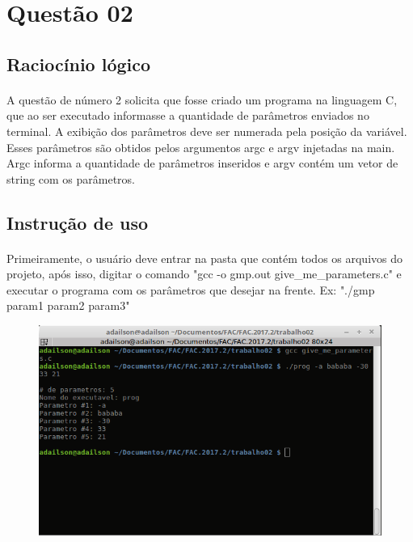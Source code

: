 \documentclass[a4paper, 12pt]{article}
\begin{document}
\section{Quest\~ao 02}
    \subsection{Racioc\'inio l\'ogico}
        \paragraph{}    A quest\~ao de n\'umero 2 solicita que fosse criado um programa na linguagem C, que ao ser executado informasse a quantidade de par\^ametros enviados no terminal. A exibi\c{c}\~ao dos par\^ametros deve ser numerada pela posi\c{c}\~ao da vari\'avel. Esses par\^ametros s\~ao obtidos pelos argumentos argc e argv injetadas na main. Argc informa a quantidade de par\^ametros inseridos e argv cont\'em um vetor de string com os par\^ametros.
	\subsection{Instru\c{c}\~ao de uso}
        \paragraph{}    Primeiramente, o usu\'ario deve entrar na pasta que cont\'em todos os arquivos do projeto, ap\'os isso, digitar o comando "gcc -o gmp.out give\_me\_parameters.c" e executar o programa com os par\^ametros que desejar na frente. Ex: "./gmp param1 param2 param3"
        
\begin{figure}[H]
	\centering
	\includegraphics[scale=0.5]{img2.png}
\end{figure}
\end{document}
